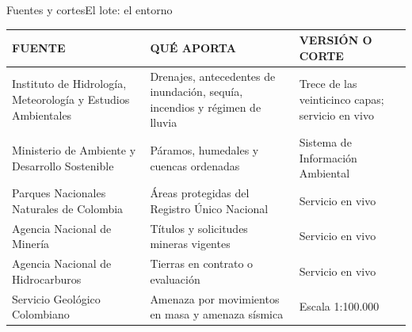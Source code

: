 \documentclass[aspectratio=169, 11pt]{beamer}
\renewcommand{\arraystretch}{1.25}
\begin{document}
\begin{frame}{Fuentes y cortes}{El lote: el entorno}
  {\scriptsize\renewcommand{\arraystretch}{1.14}\setlength{\tabcolsep}{4pt}
  \begin{tabular}{@{}>{\raggedright\arraybackslash}p{4.55cm} >{\raggedright\arraybackslash}p{4.95cm} >{\raggedright\arraybackslash}p{3.90cm}@{}}
    \toprule
    \textcolor{tinta3}{FUENTE} & \textcolor{tinta3}{QUÉ APORTA} & \textcolor{tinta3}{VERSIÓN O CORTE}\\
    \midrule
    Instituto de Hidrología, Meteorología y Estudios Ambientales & Drenajes, antecedentes de inundación, sequía, incendios y régimen de lluvia & Trece de las veinticinco capas; servicio en vivo\\
    Ministerio de Ambiente y Desarrollo Sostenible & Páramos, humedales y cuencas ordenadas & Sistema de Información Ambiental\\
    Parques Nacionales Naturales de Colombia & Áreas protegidas del Registro Único Nacional & Servicio en vivo\\
    Agencia Nacional de Minería & Títulos y solicitudes mineras vigentes & Servicio en vivo\\
    Agencia Nacional de Hidrocarburos & Tierras en contrato o evaluación & Servicio en vivo\\
    Servicio Geológico Colombiano & Amenaza por movimientos en masa y amenaza sísmica & Escala 1:100.000\\
    \bottomrule
  \end{tabular}}
\end{frame}
\end{document}
